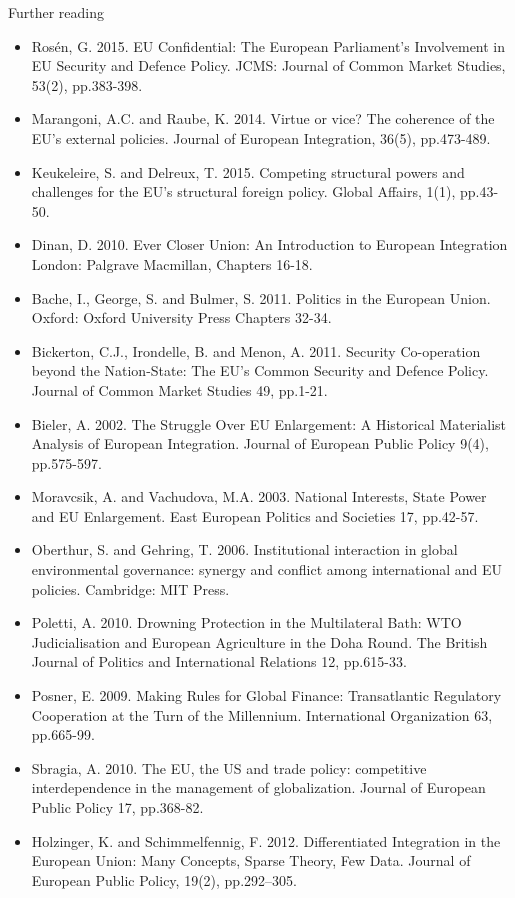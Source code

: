 \noindent Further reading

\begin{itemize}
	\item Rosén, G. 2015. EU Confidential: The European Parliament's Involvement in EU Security and Defence Policy. JCMS: Journal of Common Market Studies, 53(2), pp.383-398.
	\item Marangoni, A.C. and Raube, K. 2014. Virtue or vice? The coherence of the EU’s external policies. Journal of European Integration, 36(5), pp.473-489.
	\item Keukeleire, S. and Delreux, T. 2015. Competing structural powers and challenges for the EU's structural foreign policy. Global Affairs, 1(1), pp.43-50.
	\item Dinan, D. 2010. Ever Closer Union: An Introduction to European Integration London: Palgrave Macmillan, Chapters 16-18.
	\item Bache, I., George, S. and Bulmer, S. 2011. Politics in the European Union. Oxford: Oxford University Press Chapters 32-34.
	\item Bickerton, C.J., Irondelle, B. and Menon, A. 2011. Security Co-operation beyond the Nation-State: The EU’s Common Security and Defence Policy. Journal of Common Market Studies 49, pp.1-21.
	\item Bieler, A. 2002. The Struggle Over EU Enlargement: A Historical Materialist Analysis of European Integration. Journal of European Public Policy 9(4), pp.575-597.
	\item Moravcsik, A. and Vachudova, M.A. 2003. National Interests, State Power and EU Enlargement. East European Politics and Societies 17, pp.42-57.
	\item Oberthur, S. and Gehring, T. 2006. Institutional interaction in global environmental governance: synergy and conflict among international and EU policies. Cambridge: MIT Press.
	\item Poletti, A. 2010. Drowning Protection in the Multilateral Bath: WTO Judicialisation and European Agriculture in the Doha Round. The British Journal of Politics and International Relations 12, pp.615-33.
	\item Posner, E. 2009. Making Rules for Global Finance: Transatlantic Regulatory Cooperation at the Turn of the Millennium. International Organization 63, pp.665-99. 
	\item Sbragia, A. 2010. The EU, the US and trade policy: competitive interdependence in the management of globalization. Journal of European Public Policy 17, pp.368-82.
	\item Holzinger, K. and Schimmelfennig, F. 2012. Differentiated Integration in the European Union: Many Concepts, Sparse Theory, Few Data. Journal of European Public Policy, 19(2), pp.292–305.

\end{itemize}
